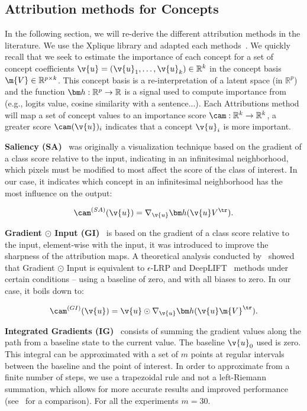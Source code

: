 \subsection{Attribution methods for Concepts}\label{sup:holistic:all_cams}

In the following section, we will re-derive the different attribution methods in the literature. We use the Xplique library and adapted each methods~\cite{fel2022xplique}.
We quickly recall that we seek to estimate the importance of each concept for a set of concept coefficients $\v{u} = (\v{u}_1, \ldots, \v{u}_k) \in \mathbb{R}^k$ in the concept basis $\m{V} \in \mathbb{R}^{p \times k}$. This concept basis is a re-interpretation of a latent space (in $\mathbb{R}^{p}$) and the function $\fb: \mathbb{R}^{p} \to \mathbb{R}$ is a signal used to compute importance from (e.g., logits value, cosine similarity with a sentence...). Each Attributions method will map a set of concept values to an importance score $\cam: \mathbb{R}^k \to \mathbb{R}^k$, a greater score $\cam(\v{u})_i$ indicates that a concept $\v{u}_i$ is more important. 

\textbf{Saliency (SA)}~\cite{simonyan2013deep} was originally a visualization technique based on the gradient of a class score relative to the input, indicating in an infinitesimal neighborhood, which pixels must be modified to most affect the score of the class of interest. In our case, it indicates which concept in an infinitesimal neighborhood has the most influence on the output:

$$ \cam^{(SA)}(\v{u}) = \nabla_{\v{u}} \fb(\v{u} V^\tr) .$$

\textbf{Gradient $\odot$ Input (GI)}~\cite{shrikumar2017learning} is based on the gradient of a class score relative to the input, element-wise with the input, it was introduced to improve the sharpness of the attribution maps. A theoretical analysis conducted by~\cite{ancona2017better} showed that Gradient $\odot$ Input is equivalent to $\epsilon$-LRP and DeepLIFT~\cite{shrikumar2017learning} methods under certain conditions -- using a baseline of zero, and with all biases to zero. In our case, it boils down to:

$$ \cam^{(GI)}(\v{u}) = \v{u} \odot \nabla_{\v{u}} \fb(\v{u} \m{V}^\tr) .$$

\textbf{Integrated Gradients (IG)}~\cite{sundararajan2017axiomatic} consists of summing the gradient values along the path from a baseline state to the current value. The baseline $\v{u}_0$ used is zero. This integral can be approximated with a set of $m$ points at regular intervals between the baseline and the point of interest. In order to approximate from a finite number of steps, we use a trapezoidal rule and not a left-Riemann summation, which allows for more accurate results and improved performance (see~\cite{sotoudeh2019computing} for a comparison). For all the experiments $m = 30$.

